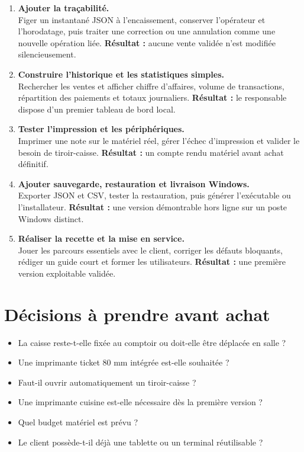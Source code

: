 \documentclass[11pt,a4paper]{article}
\begin{document}
\begin{enumerate}
  \item \textbf{Ajouter la traçabilité.}\\
  Figer un instantané JSON à l'encaissement, conserver l'opérateur et l'horodatage, puis traiter
  une correction ou une annulation comme une nouvelle opération liée. \textbf{Résultat :} aucune
  vente validée n'est modifiée silencieusement.

  \item \textbf{Construire l'historique et les statistiques simples.}\\
  Rechercher les ventes et afficher chiffre d'affaires, volume de transactions, répartition des
  paiements et totaux journaliers. \textbf{Résultat :} le responsable dispose d'un premier tableau
  de bord local.

  \item \textbf{Tester l'impression et les périphériques.}\\
  Imprimer une note sur le matériel réel, gérer l'échec d'impression et valider le besoin de
  tiroir-caisse. \textbf{Résultat :} un compte rendu matériel avant achat définitif.

  \item \textbf{Ajouter sauvegarde, restauration et livraison Windows.}\\
  Exporter JSON et CSV, tester la restauration, puis générer l'exécutable ou l'installateur.
  \textbf{Résultat :} une version démontrable hors ligne sur un poste Windows distinct.

  \item \textbf{Réaliser la recette et la mise en service.}\\
  Jouer les parcours essentiels avec le client, corriger les défauts bloquants, rédiger un guide
  court et former les utilisateurs. \textbf{Résultat :} une première version exploitable validée.
\end{enumerate}

\section{Décisions à prendre avant achat}

\begin{itemize}
  \item La caisse reste-t-elle fixée au comptoir ou doit-elle être déplacée en salle ?
  \item Une imprimante ticket 80 mm intégrée est-elle souhaitée ?
  \item Faut-il ouvrir automatiquement un tiroir-caisse ?
  \item Une imprimante cuisine est-elle nécessaire dès la première version ?
  \item Quel budget matériel est prévu ?
  \item Le client possède-t-il déjà une tablette ou un terminal réutilisable ?
\end{itemize}
\end{document}
